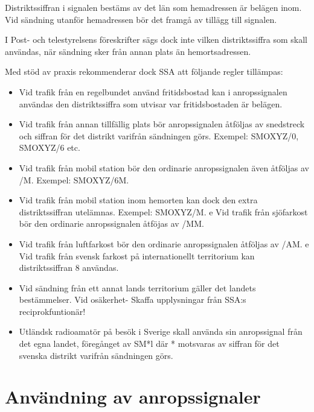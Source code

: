 Distriktssiffran i signalen bestäms av det län som hemadressen är
belägen inom. Vid sändning utanför hemadressen bör det framgå av
tillägg till signalen.


I Post- och telestyrelsens föreskrifter sägs dock inte vilken
distriktssiffra som skall användas, när sändning sker från annan plats
än hemortsadressen.

Med stöd av praxis rekommenderar dock SSA att följande regler
tillämpas:

\begin{itemize}

\item Vid trafik från en regelbundet använd fritidsbostad kan i
  anropssignalen användas den distriktssiffra som utvisar var
  fritidsbostaden är belägen.

\item Vid trafik från annan tillfällig plats bör anropssignalen
  åtföljas av snedstreck och siffran för det distrikt varifrån
  sändningen görs.  Exempel: SMOXYZ/0, SMOXYZ/6 etc.

\item Vid trafik från mobil station bör den ordinarie anropssignalen
  även åtföljas av /M.  Exempel: SMOXYZ/6M.

\item Vid trafik från mobil station inom hemorten kan dock den extra
  distriktssiffran utelämnas.  Exempel: SMOXYZ/M.  e Vid trafik från
  sjöfarkost bör den ordinarie anropssignalen åtföjas av /MM.

\item Vid trafik från luftfarkost bör den ordinarie anropssignalen
  åtföljas av /AM.  e Vid trafik från svensk farkost på
  internationellt territorium kan distriktssiffran 8 användas.

\item Vid sändning från ett annat lands territorium gäller det landets
  bestämmelser.  Vid osäkerhet- Skaffa upplysningar från SSA:s
  reciprokfuntionär!

\item Utländsk radioamatör på besök i Sverige skall använda sin
  anropssignal från det egna landet, föregånget av SM*l där *
  motsvaras av siffran för det svenska distrikt varifrån sändningen
  görs.
\end{itemize}

\section{Användning av anropssignaler}

